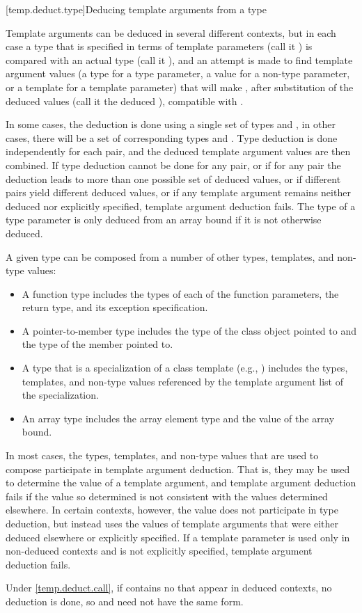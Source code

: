 [temp.deduct.type]{Deducing template arguments from a type}

\pnum
Template arguments can be deduced in several different contexts, but
in each case a type that is specified in terms of template parameters
(call it
)
is compared with an actual type (call it
),
and an attempt is made to find template argument values (a type for a type
parameter, a value for a non-type parameter, or a template for a
template parameter) that will make
,
after substitution of the deduced values (call it the deduced
),
compatible with
.

\pnum
In some cases, the deduction is done using a single set of types
and
,
in other cases, there will be a set of corresponding types
and
.
Type deduction is done
independently for each
pair, and the deduced template
argument values are then combined.
If type deduction cannot be done
for any
pair, or if for any pair the deduction leads to more than
one possible set of deduced values, or if different pairs yield
different deduced values, or if any template argument remains neither
deduced nor explicitly specified, template argument deduction fails.
The type of a type parameter
is only deduced from an array bound
if it is not otherwise deduced.

\pnum
A given type
can be composed from a number of other
types, templates, and non-type values:

\begin{itemize}
\item
A function type includes the types of each of the function parameters,
the return type, and its exception specification.
\item
A pointer-to-member type includes the type of the class object pointed to
and the type of the member pointed to.
\item
A type that is a specialization of a class template (e.g.,
)
includes the types, templates, and non-type values referenced by the
template argument list of the specialization.
\item
An array type includes the array element type and the value of the
array bound.
\end{itemize}

\pnum
In most cases, the types, templates, and non-type values that are used
to compose
participate in template argument deduction.
That is,
they may be used to determine the value of a template argument, and
template argument deduction fails if
the value so determined is not consistent with the values determined
elsewhere.
In certain contexts, however, the value does not
participate in type deduction, but instead uses the values of template
arguments that were either deduced elsewhere or explicitly specified.
If a template parameter is used only in non-deduced contexts and is not
explicitly specified, template argument deduction fails.
\begin{note}
Under \ref{temp.deduct.call},
if  contains no  that appear
in deduced contexts, no deduction is done, so  and 
need not have the same form.
\end{note}

